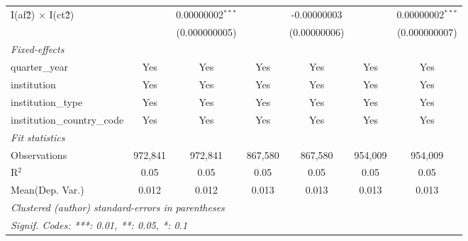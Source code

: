 \begin{tabular}{lcccccc}
   I(af\^2) $\times$ I(ct\^2)         &                & 0.00000002$^{***}$ &                & -0.00000003     &                & 0.00000002$^{***}$\\   
                                      &                & (0.000000005)      &                & (0.00000006)    &                & (0.000000007)\\   
   \midrule
   \emph{Fixed-effects}\\
   quarter\_year                      & Yes            & Yes                & Yes            & Yes             & Yes            & Yes\\  
   institution                        & Yes            & Yes                & Yes            & Yes             & Yes            & Yes\\  
   institution\_type                  & Yes            & Yes                & Yes            & Yes             & Yes            & Yes\\  
   institution\_country\_code         & Yes            & Yes                & Yes            & Yes             & Yes            & Yes\\  
   \midrule
   \emph{Fit statistics}\\
   Observations                       & 972,841        & 972,841            & 867,580        & 867,580         & 954,009        & 954,009\\  
   R$^2$                              & 0.05           & 0.05               & 0.05           & 0.05            & 0.05           & 0.05\\  
Mean(Dep. Var.) & 0.012 & 0.012 & 0.013 & 0.013 & 0.013 & 0.013 \\
   \midrule \midrule
   \multicolumn{7}{l}{\emph{Clustered (author) standard-errors in parentheses}}\\
   \multicolumn{7}{l}{\emph{Signif. Codes: ***: 0.01, **: 0.05, *: 0.1}}\\
\end{tabular}
\par\endgroup
